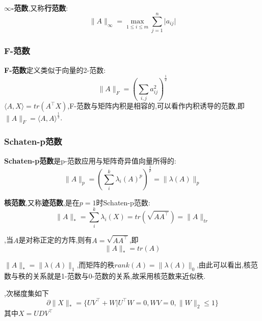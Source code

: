 \documentclass[UTF8]{ctexart}
\newcommand{\s}{\quad}
\renewcommand{\b}{\textbf}
\newcommand{\p}{\paragraph{}\s}
\newcommand{\sssect}{\subsubsection}
\newcommand{\equ}[1]{\begin{equation}#1\end{equation}}
\newcommand{\abs}[1]{\lvert#1\rvert}
\newcommand{\norm}[1]{\lVert#1\rVert}
\newcommand{\inprod}[1]{\langle#1\rangle}
\newcommand{\Real}[1]{\mathbb{R}^{#1}}
\newcommand{\nunorm}{\norm{X}_*}
\numberwithin{equation}{section}
\begin{document}
		\p\b{$\infty$-范数},又称\b{行范数}:
		\[\norm{A}_\infty=\max_{1\leq i\leq m}\sum_{j=1}^n\abs{a_{ij}}\]

		\sssect{F-范数}
		\b{F-范数}定义类似于向量的2-范数:
		\[\norm{A}_F=(\sum_{i,j}a_{ij}^2)^{\frac{1}{2}}\]
		$\inprod{A,X}=tr(A^\top X)$,F-范数与矩阵内积是相容的,可以看作内积诱导的范数,即$\norm{A}_F=\inprod{A,A}^{\frac{1}{2}}$.

		\sssect{Schaten-p范数}
		\b{Schaten-p范数}是p-范数应用与矩阵奇异值向量所得的:
		\[\norm{A}_p=(\sum_i^k\lambda_i(A)^p)^{\frac{1}{p}}=\norm{\lambda(A)}_p\]

		\b{核范数},又称\b{迹范数},是在$p=1$时Schaten-p范数:
		\[\norm{A}_*=\sum_i^k\lambda_i(X)=tr(\sqrt{AA^\top})=\norm{A}_{tr}\]


		,当$A$是对称正定的方阵,则有$A=\sqrt{AA^\top}$,即
		\[\norm{A}_*=tr(A)\]

		$\norm{A}_*=\norm{\lambda(A)}_1$,而矩阵的秩$rank(A)=\norm{\lambda(A)}_0$,由此可以看出,核范数与秩的关系就是1-范数与0-范数的关系,故采用核范数来近似秩.

		,次梯度集如下
		\equ{\partial\nunorm=\{UV^\top+W\vert U^\top W=0,WV=0,\norm{W}_2\leq1\}}
		其中$X=UDV^\top$
\end{document}
